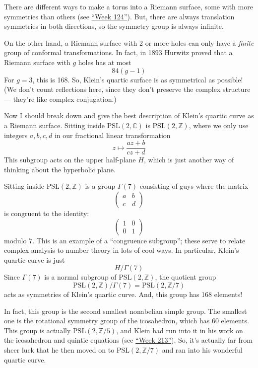 \documentclass{article}
\begin{document}
There are different ways to make a torus into a Riemann surface, some
with more symmetries than others (see \protect\hyperlink{week124}{``Week
124''}). But, there are always translation symmetries in both
directions, so the symmetry group is always infinite.

On the other hand, a Riemann surface with 2 or more holes can only have
a \emph{finite} group of conformal transformations. In fact, in 1893
Hurwitz proved that a Riemann surface with \(g\) holes has at most
\[84(g - 1)\] For \(g = 3\), this is 168. So, Klein's quartic surface is
as symmetrical as possible! (We don't count reflections here, since they
don't preserve the complex structure --- they're like complex
conjugation.)

Now I should break down and give the best description of Klein's quartic
curve as a Riemann surface. Sitting inside
\(\mathrm{PSL}(2,\mathbb{C})\) is \(\mathrm{PSL}(2,\mathbb{Z})\), where
we only use integers \(a,b,c,d\) in our fractional linear transformation
\[z\mapsto\frac{az+b}{cz+d}\] This subgroup acts on the upper half-plane
\(H\), which is just another way of thinking about the hyperbolic plane.

Sitting inside \(\mathrm{PSL}(2,\mathbb{Z})\) is a group \(\Gamma(7)\)
consisting of guys where the matrix \[
  \left(
    \begin{array}{cc}
      a&b\\c&d
    \end{array}
  \right)
\] is congruent to the identity: \[
  \left(
    \begin{array}{cc}
      1&0\\0&1
    \end{array}
  \right)
\] modulo \(7\). This is an example of a ``congruence subgroup''; these
serve to relate complex analysis to number theory in lots of cool ways.
In particular, Klein's quartic curve is just \[H/\Gamma(7)\] Since
\(\Gamma(7)\) is a normal subgroup of \(\mathrm{PSL}(2,\mathbb{Z})\),
the quotient group
\[\mathrm{PSL}(2,\mathbb{Z})/\Gamma(7) = \mathrm{PSL}(2,\mathbb{Z}/7)\]
acts as symmetries of Klein's quartic curve. And, this group has 168
elements!

In fact, this group is the second smallest nonabelian simple group. The
smallest one is the rotational symmetry group of the icosahedron, which
has 60 elements. This group is actually
\(\mathrm{PSL}(2,\mathbb{Z}/5)\), and Klein had run into it in his work
on the icosahedron and quintic equations (see
\protect\hyperlink{week213}{``Week 213''}). So, it's actually far from
sheer luck that he then moved on to \(\mathrm{PSL}(2,\mathbb{Z}/7)\) and
ran into his wonderful quartic curve.
\end{document}

